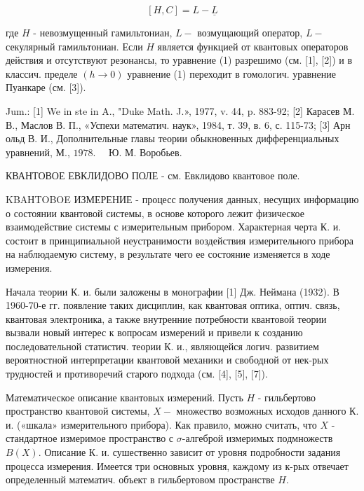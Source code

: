\documentclass[10pt]{article}
\begin{document}
\[

[H, C]=L-\underline{L}

\]



где $H$ - невозмущенный гамильтониан, $L-$ возмущающий оператор, $L-$ секулярный гамильтониан. Если $H$ является функцией от квантовых операторов действия и отсутствуют резонансы, то уравнение (1) разрешимо (см. [1], [2]) и в классич. пределе $(h \rightarrow 0)$ уравнение (1) переходит в гомологич. уравнение Пуанкаре (см. [3]).



Jum.: [1] We in ste in A., "Duke Math. J.», 1977, v. 44, p. 883-92; [2] Карасев М. В., Маслов В. П., «Успехи математич. наук», 1984, т. 39, в. 6, с. 115-73; [3] Арн ольд В. И., Дополнительные главы теории обыкновенных дифференциальных уравнений, М., $1978 . \quad$ Ю. М. Воробьев.



КВАНТОВОЕ ЕВКЛИДОВО ПОЛЕ - см. Евклидово квантовое поле.



KBAНTOBOE ИЗМЕРЕНИЕ - процесс получения данных, несущих информацию о состоянии квантовой системы, в основе которого лежит физическое взаимодействие системы с измерительным прибором. Характерная черта К. и. состоит в принципиальной неустранимости воздействия измерительного прибора на наблюдаемую систему, в результате чего ее состояние изменяется в ходе измерения.



Начала теории К. и. были заложены в монографии [1] Дж. Неймана (1932). В 1960-70-е гг. появление таких дисциплин, как квантовая оптика, оптич. связь, квантовая электроника, а также внутренние потребности квантовой теории вызвали новый интерес к вопросам измерений и привели к созданию последовательной статистич. теории К. и., являющейся логич. развитием вероятностной интерпретации квантовой механики и свободной от нек-рых трудностей и противоречий старого подхода (см. [4], [5], [7]).



Математическое описание квантовых измерений. Пусть $H$ - гильбертово пространство квантовой системы, $X-$ множество возможных исходов данного К. и. («шкала» измерительного прибора). Как правило, можно считать, что $X$ - стандартное измеримое пространство с $\sigma$-алгеброй измеримых подмножеств $B(X)$. Описание К. и. сушественно зависит от уровня подробности задания процесса измерения. Имеется три основных уровня, каждому из к-рых отвечает определенный математич. объект в гильбертовом пространстве $H$.
\end{document}
